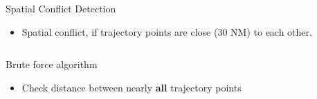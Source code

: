 \documentclass[10pt]{beamer}
\begin{document}
\begin{frame}[t]{Spatial Conflict Detection}
    \begin{itemize}
        \item Spatial conflict, if trajectory points are close (30 NM) to each other.
    \end{itemize}
    \begin{overprint}%
	\begin{columns}[t]
         {%
            \begin{block}{Brute force algorithm}
                \begin{itemize}
                    \item Check distance between nearly {\bf all} trajectory points
                \end{itemize} 
                \begin{center}
                \end{center}
            \end{block}
        }%

\end{columns}
\end{overprint}
\end{frame}
\end{document}

